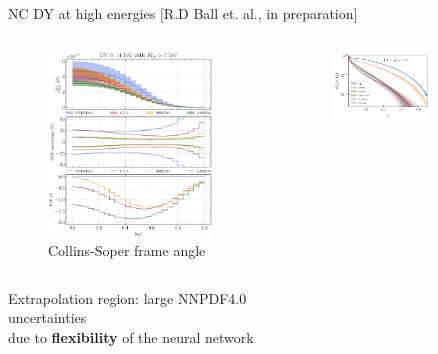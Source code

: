 \documentclass[aspectratio=169,9pt]{beamer}
\begin{document}
\begin{frame}{NC DY at high energies [R.D Ball et. al., in preparation]}
\begin{columns}
\begin{column}{0.66\textwidth}
\begin{column}{0.5\textwidth}
\begin{figure}
                    \includegraphics[width=0.9\textwidth]{CMS_DY_14TEV_MLL_5000_YLL}
                    \caption*{Collins-Soper frame angle}
                \end{figure}
            \end{column}
        Extrapolation region: large NNPDF4.0 uncertainties \\
        due to \textbf{flexibility} of the neural network
        \end{column}
        \begin{column}{0.33\textwidth}
            \begin{figure}
                \includegraphics[width=0.7\textwidth]{pdfplot-abslargex-ct18}\\

\end{figure}
\end{column}
\end{columns}
\end{frame}
\end{document}
